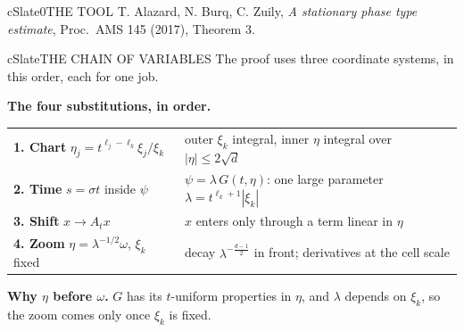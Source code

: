 \documentclass[10pt]{article}
\newcommand{\R}{\mathbb{R}}
\newcommand{\lab}[2]{\textbf{\color{#1}#2}}
\begin{document}
\begin{minipage}[t][49.0cm][t]{0.322\textwidth}
\begin{panel}{cSlate}{0}{THE TOOL}
{\footnotesize\color{cGray}T. Alazard, N. Burq, C. Zuily, \emph{A stationary phase type
estimate}, Proc.\ AMS 145 (2017), Theorem 3.}
\end{panel}
\vfill
\begin{panel}{cSlate}{\scalebox{1.1}{$\to$}}{THE CHAIN OF VARIABLES}
The proof uses three coordinate systems, in this order, each for one job.
\begin{center}
\end{center}

\lab{cSlate}{The four substitutions, in order.}

{\small\setlength{\tabcolsep}{4pt}
\begin{tabular}{@{}>{\raggedright}p{4.7cm}>{\raggedright\arraybackslash}p{6.7cm}@{}}
\textbf{1. Chart} $\eta_j=t^{\ell_j-\ell_k}\xi_j/\xi_k$ & outer $\xi_k$ integral, inner $\eta$ integral over $|\eta|\le2\sqrt d$\\
\textbf{2. Time} $s=\sigma t$ inside $\psi$ & $\psi=\lambda\,G(t,\eta)$: one large parameter $\lambda=t^{\ell_k+1}|\xi_k|$\\
\textbf{3. Shift} $x\to A_tx$ & $x$ enters only through a term linear in $\eta$\\
\textbf{4. Zoom} $\eta=\lambda^{-1/2}\omega$, $\xi_k$ fixed & decay $\lambda^{-\frac{d-1}{2}}$ in front; derivatives at the cell scale\\
\end{tabular}}

\smallskip\lab{cSlate}{Why $\eta$ before $\omega$.} $G$ has its $t$-uniform properties in $\eta$, and
$\lambda$ depends on $\xi_k$, so the zoom comes only once $\xi_k$ is fixed.


\end{panel}
\end{minipage}
\end{document}
